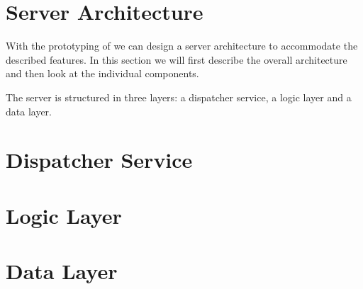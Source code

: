 \section{Server Architecture}
\label{sec:server}
With the prototyping of  we can design a server architecture to accommodate the described features. In this section we will first describe the overall architecture and then look at the individual components.


The server is structured in three layers: a dispatcher service, a logic layer and a data layer. 




\section{Dispatcher Service}




\section{Logic Layer}




\section{Data Layer}


